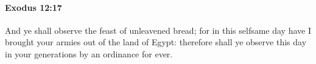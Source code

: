 
		\paragraph{Exodus 12:17} %
			\label{EXODUS-12-17}

			And ye shall observe the feast of unleavened bread; for in this selfsame day have I brought your armies out of the land of Egypt: therefore shall ye observe this day in your generations by an ordinance for ever.


